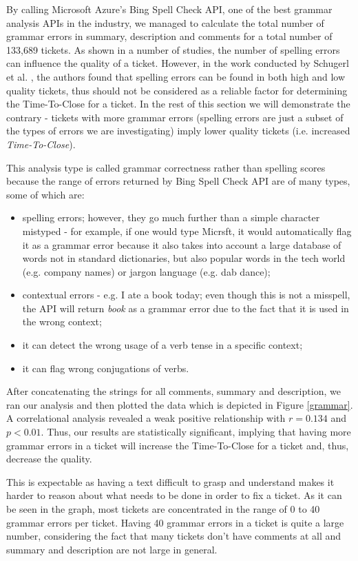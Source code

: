 \documentclass{mpaper}
\begin{document}
By calling Microsoft Azure's Bing Spell Check API, one of the best grammar analysis APIs in the industry, we 
managed to calculate the total number of grammar errors in summary, description and comments for a total number 
of 133,689 tickets. As shown in a number of studies, the number of spelling errors can influence the quality of a ticket. 
However, in the work conducted by Schugerl et al. \cite{schugerl2008mining}, the authors found that spelling errors 
can be found in both high and low quality tickets, thus should not be considered as a reliable factor for determining
the Time-To-Close for a ticket. In the rest of this section we will demonstrate the contrary - tickets with more 
grammar errors (spelling errors are just a subset of the types of errors we are investigating) imply lower quality
tickets (i.e. increased \emph{Time-To-Close}). 

This analysis type is called grammar correctness rather than spelling scores because the range of errors returned 
by Bing Spell Check API are of many types, some of which are:
\begin{itemize}
  \item spelling errors; however, they go much further than a simple character mistyped - for example,
  if one would type Micrsft, it would automatically flag it as a grammar error because it also takes into account a large 
  database of words not in standard dictionaries, but also popular words in the tech world (e.g. company names) or 
  jargon language (e.g. dab dance);
  \item contextual errors - e.g. I ate a book today; even though this is not a misspell, the API will return \emph{book} as 
  a grammar error due to the fact that it is used in the wrong context;
  \item it can detect the wrong usage of a verb tense in a specific context;
  \item it can flag wrong conjugations of verbs.
\end{itemize}

After concatenating the strings for all comments, summary and description, we ran our analysis and then plotted the 
data which is depicted in Figure \ref{grammar}. A correlational analysis revealed a weak positive
relationship with $r = 0.134$ and $p < 0.01$. Thus, our results are statistically significant, implying that 
having more grammar errors in a ticket will increase the Time-To-Close for a ticket and, thus, decrease the quality. 

This is expectable as having a text difficult to grasp and understand makes it harder to reason about what needs 
to be done in order to fix a ticket. As it can be seen in the graph, most tickets are concentrated in the range of 
0 to 40 grammar errors per ticket. Having 40 grammar errors in a ticket is quite a large number, considering the fact 
that many tickets don't have comments at all and summary and description are not large in general. 
\end{document}
